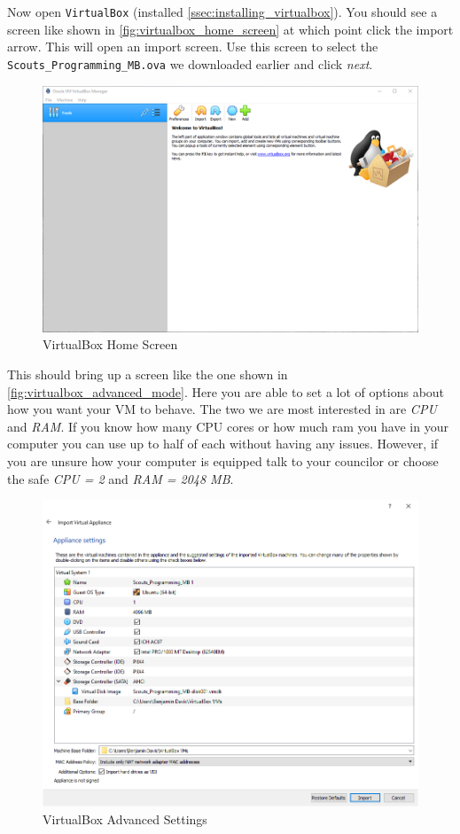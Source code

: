    Now open \texttt{VirtualBox} (installed \autoref{ssec:installing_virtualbox}).
    You should see a screen like shown in \autoref{fig:virtualbox_home_screen} at which point click the import arrow.
    This will open an import screen.
    Use this screen to select the \texttt{Scouts\_Programming\_MB.ova} we downloaded earlier and click \textit{next}.

    \begin{figure}[ht]
      \centering
      \includegraphics[width=0.8\linewidth]{virtualbox_home_screen.png}
      \caption{VirtualBox Home Screen}
      \label{fig:virtualbox_home_screen}
    \end{figure}
    \FloatBarrier

    This should bring up a screen like the one shown in \autoref{fig:virtualbox_advanced_mode}.
    Here you are able to set a lot of options about how you want your VM to behave.
    The two we are most interested in are \textit{CPU} and \textit{RAM}.
    If you know how many CPU cores or how much ram you have in your computer you can use up to half of each without having any issues.
    However, if you are unsure how your computer is equipped talk to your councilor or choose the safe \textit{CPU = 2} and \textit{RAM = 2048 MB}.

    \begin{figure}[ht]
      \centering
      \includegraphics[width=0.8\linewidth]{virtualbox_advanced_mode.png}
      \caption{VirtualBox Advanced Settings}
      \label{fig:virtualbox_advanced_mode}
    \end{figure}
    \FloatBarrier

